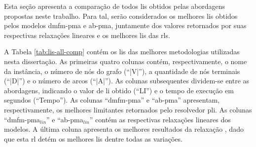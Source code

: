 Esta seção  apresenta a comparação  de todos \gls{li}s obtidos  pelas abordagens
propostas neste  trabalho. Para  tal, serão  considerados os  melhores \gls{li}s
obtidos  pelos modelos  \gls{dmfm-pma}  e \gls{ab-pma},  juntamente dos  valores
retornados por suas respectivas relaxações  lineares e os melhores \gls{li}s das
\gls{rl}s.

A Tabela  \ref{tab:lis-all-comp} contém  os \gls{li}s das  melhores metodologias
utilizadas   nesta   dissertação.   As    primeiras   quatro   colunas   contém,
respectivamente, o  nome da  instância, o  número de nós  do grafo  (``|V|''), a
quantidade de nós terminais (``|D|'') e  o número de arcos (``|A|''). As colunas
subsequentes  dividem-se entre  as  abordagens, indicando  o  valor de  \gls{li}
obtido  (``LI'') e  o  tempo de  execução em  segundos  (``Tempo''). As  colunas
``\gls{dmfm-pma}'' e  ``\gls{ab-pma}'' apresentam, respectivamente,  os melhores
limitantes     retornados    pelo     resolvedor    \gls{pli}.     As    colunas
``\gls{dmfm-pma}$_{lin}$''  e  ``\gls{ab-pma}$_{lin}$''  contém  as  respectivas
relaxações  lineares  dos  modelos.  A   última  coluna  apresenta  os  melhores
resultados  da  relaxação {\rlq},  dado  que  esta  \gls{rl} detém  os  melhores
\gls{li}s dentre todas as variações.

